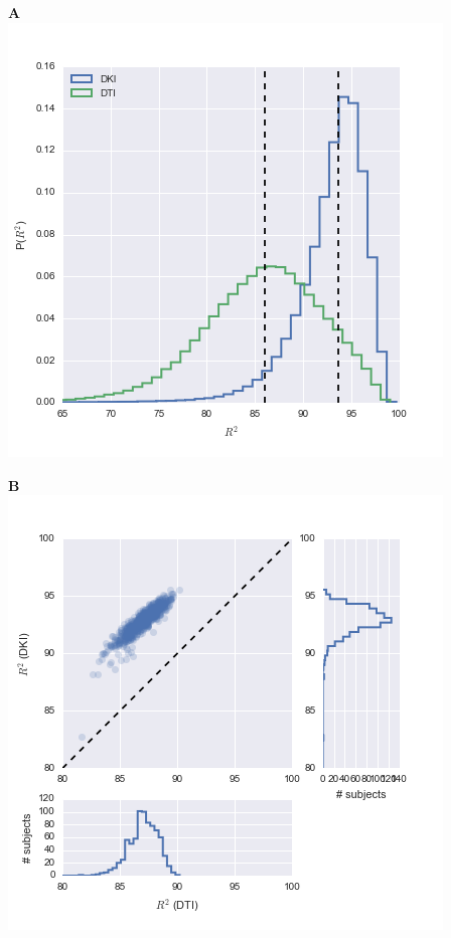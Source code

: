 \documentclass[a0, landscape]{a0poster}
\begin{document}
\begin{multicols}{3}
\begin{minipage}[b]{1\linewidth}
  \large
  \begin{minipage}[b]{0.33\linewidth}
  \textbf{A}\\
  \includegraphics[width=11.5cm]{histogram_cod_dki_dti.png}
  \end{minipage}
  \begin{minipage}[b]{0.33\linewidth}
  \textbf{B}\\
  \includegraphics[width=11.5cm]{dti_dki.png}

\end{minipage}
\end{minipage}
\end{multicols}
\end{document}
